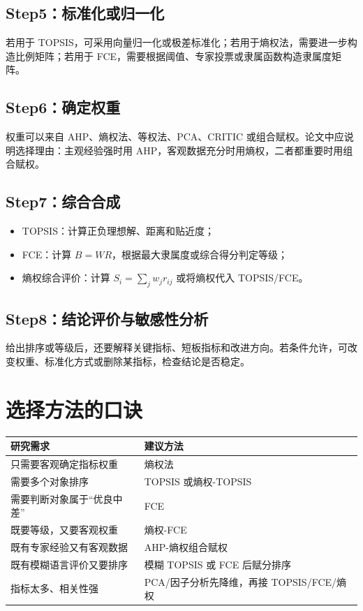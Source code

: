 \documentclass[UTF8,zihao=-4]{ctexart}
\begin{document}
\subsection{Step5：标准化或归一化}
若用于 TOPSIS，可采用向量归一化或极差标准化；若用于熵权法，需要进一步构造比例矩阵；若用于 FCE，需要根据阈值、专家投票或隶属函数构造隶属度矩阵。

\subsection{Step6：确定权重}
权重可以来自 AHP、熵权法、等权法、PCA、CRITIC 或组合赋权。论文中应说明选择理由：主观经验强时用 AHP，客观数据充分时用熵权，二者都重要时用组合赋权。

\subsection{Step7：综合合成}
\begin{itemize}
  \item TOPSIS：计算正负理想解、距离和贴近度；
  \item FCE：计算 $B=WR$，根据最大隶属度或综合得分判定等级；
  \item 熵权综合评价：计算 $S_i=\sum_j w_j r_{ij}$ 或将熵权代入 TOPSIS/FCE。
\end{itemize}

\subsection{Step8：结论评价与敏感性分析}
给出排序或等级后，还要解释关键指标、短板指标和改进方向。若条件允许，可改变权重、标准化方式或删除某指标，检查结论是否稳定。

\section{选择方法的口诀}
\begin{longtable}{p{5cm}p{8.5cm}}
\toprule
研究需求 & 建议方法 \\
\midrule
只需要客观确定指标权重 & 熵权法 \\
需要多个对象排序 & TOPSIS 或熵权-TOPSIS \\
需要判断对象属于“优良中差” & FCE \\
既要等级，又要客观权重 & 熵权-FCE \\
既有专家经验又有客观数据 & AHP-熵权组合赋权 \\
既有模糊语言评价又要排序 & 模糊 TOPSIS 或 FCE 后赋分排序 \\
指标太多、相关性强 & PCA/因子分析先降维，再接 TOPSIS/FCE/熵权 \\
\bottomrule
\end{longtable}
\end{document}
